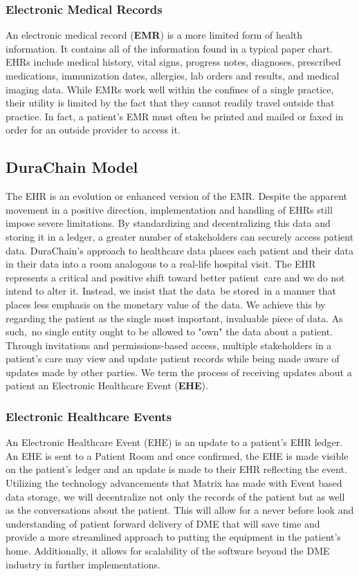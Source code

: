 \documentclass[letterpaper]{article}
\begin{document}
  \subsubsection{Electronic Medical Records}
  An electronic medical record (\textbf{EMR}) is a more limited form of health information. It contains all of the information found in a typical paper chart. EHRs include medical history, vital signs, progress notes, diagnoses, prescribed medications, immunization dates, allergies, lab orders and results, and medical imaging data. While EMRs work well within the confines of a single practice, their utility is limited by the fact that they cannot readily travel outside that practice. In fact, a patient's EMR must often be printed and mailed or faxed in order for an outside provider to access it.
%
\subsection{DuraChain Model}
The EHR is an evolution or enhanced version of the EMR. Despite the apparent movement in a positive direction, implementation and handling of EHRs still impose severe limitations. By standardizing and decentralizing this data and storing it in a ledger, a greater number of stakeholders can securely access patient data. DuraChain's approach to healthcare data places each patient and their data in their data into a room analogous to a real-life hospital visit.
%
The EHR represents a critical and positive shift toward better patient care and we do not intend to alter it. Instead, we insist that the data be stored in a manner that places less emphasis on the monetary value of the data.
%
We achieve this by regarding the patient as the single most important, invaluable piece of data. As such, no single entity ought to be allowed to "own" the data about a patient. Through invitations and permissions-based access, multiple stakeholders in a patient's care may view and update patient records while being made aware of updates made by other parties. We term the process of receiving updates about a patient an Electronic Healthcare Event (\textbf{EHE}).
%
  \subsubsection{Electronic Healthcare Events}
  An Electronic Healthcare Event (EHE) is an update to a patient’s EHR ledger. An EHE is sent to a Patient Room and once confirmed, the EHE is made visible on the patient’s ledger and an update is made to their EHR reflecting the event.
%
  Utilizing the technology advancements that Matrix has made with Event based data storage, we will decentralize not only the records of the patient but as well as the conversations about the patient. This will allow for a never before look and understanding of patient forward delivery of DME that will save time and provide a more streamlined approach to putting the equipment in the patient's home. Additionally, it allows for scalability of the software beyond the DME industry in further implementations.
%
\end{document}
